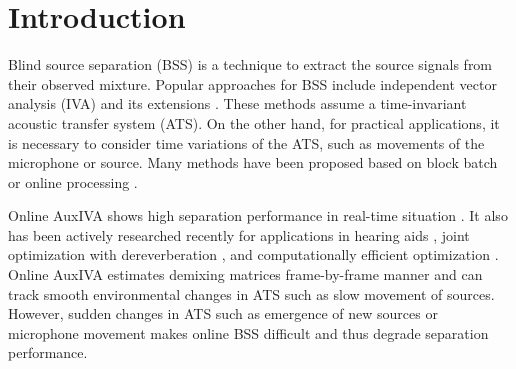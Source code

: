 \documentclass[sip,biber]{now-journal}
\begin{document}
\section{Introduction}\label{sec:intro}
%
%
Blind source separation (BSS) \cite{Makino:2018:ASS} is a technique to extract the source signals from their observed mixture.
Popular approaches for BSS include independent vector analysis (IVA) \cite{Kim:2006:ASLP,Hiroe:2006:ICA} and its extensions \cite{Kitamura:2016:ASLP,Nugraha:2020:SPL,Brendel:2020:SP}.
These methods assume a time-invariant acoustic transfer system (ATS).
On the other hand, for practical applications, it is necessary to consider time variations of the ATS, such as movements of the microphone or source.
Many methods have been proposed based on block batch \cite{Koldovsky:2019:ICASSP,Koldovsky:2021:SP,Jansky:2022:ASMP} or online processing \cite{Kim:2010:CASI,Taniguchi:2014:HSCMA}.

Online AuxIVA shows high separation performance in real-time situation \cite{Taniguchi:2014:HSCMA}.
It also has been actively researched recently for applications in hearing aids \cite{Sunohara:2017:ICASSP}, joint optimization with dereverberation \cite{Ueda:2021:ICASSP}, and computationally efficient optimization \cite{Nakashima:2023:ICASSP}.
Online AuxIVA estimates demixing matrices frame-by-frame manner and can track smooth environmental changes in ATS such as slow movement of sources.
However, sudden changes in ATS such as emergence of new sources or microphone movement makes online BSS difficult and thus degrade separation performance.
\end{document}
